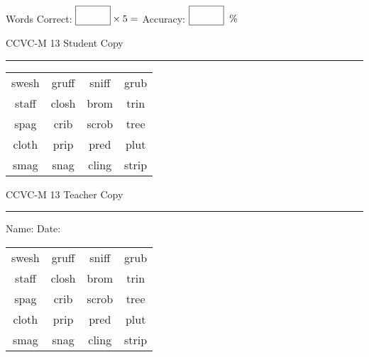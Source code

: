 \documentclass{memoir}
\begin{document}
\small

Words Correct: $\fbox{\phantom{\huge 100}} \times 5 = $ Accuracy: $\fbox{\phantom{\huge 100}}\;\; \%$ 

\vfill

\newpage


\footnotesize \noindent
CCVC-M 13 \hfill Student Copy
\smallskip
\hrule

\Large

\setlength{\tabcolsep}{14pt}
\def\arraystretch{3}

{\selectfont


\begin{vplace}[0.5]
\begin{center}
\begin{tabular}{cccc}
swesh & gruff & sniff & grub \\
staff            & closh            & brom          & trin \\
spag          & crib & scrob & tree \\
cloth & prip & pred & plut \\
smag & snag & cling & strip \\
\end{tabular}
\end{center}
\end{vplace}

}

\newpage

\footnotesize \noindent
CCVC-M 13 \hfill Teacher Copy
\smallskip
\hrule

\small

\vfill

\noindent
Name: \underline{\hspace{1.75in}} \hfill Date: \underline{\hspace{1in}}

\Large

{\selectfont


\begin{vplace}[0.5]
\begin{center}
\begin{tabular}{cccc}
swesh & gruff & sniff & grub \\
staff            & closh            & brom          & trin \\
spag          & crib & scrob & tree \\
cloth & prip & pred & plut \\
smag & snag & cling & strip \\
\end{tabular}
\end{center}
\end{vplace}



}
\end{document}

